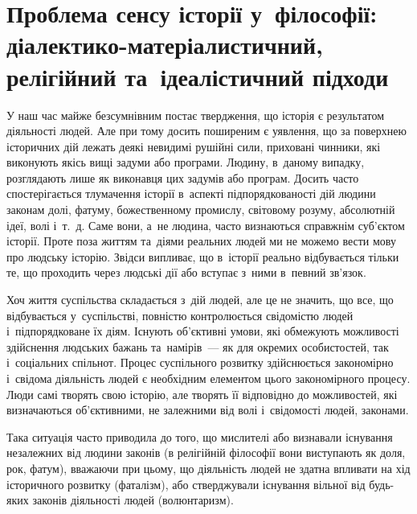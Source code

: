 \documentclass[a5paper,oneside,DIV=12,12pt,headings=small]{scrartcl}
\begin{document}
	\section{Проблема сенсу історії у~філософії: діалектико-матеріалистичний, релігійний та~ідеалістичний підходи}
		У наш час майже безсумнівним постає твердження, що історія є результатом діяльності людей. Але при тому досить поширеним є уявлення, що за поверхнею історичних дій лежать деякі невидимі рушійні сили, приховані чинники, які виконують якісь вищі задуми або програми. Людину, в~даному випадку, розглядають лише як виконавця цих задумів або програм. Досить часто спостерігається тлумачення історії в~аспекті підпорядкованості дій людини законам долі, фатуму, божественному промислу, світовому розуму, абсолютній ідеї, волі і~т.~д. Саме вони, а~не людина, часто визнаються справжнім суб'\-єктом історії. Проте поза життям та~діями реальних людей ми не можемо вести мову про людську історію. Звідси випливає, що в~історії реально відбувається тільки те, що проходить через людські дії або вступає з~ними в~певний зв'язок. 
		
		Хоч життя суспільства складається з~дій людей, але це не значить, що все, що відбувається у~суспільстві, повністю контролюється свідомістю людей і~підпорядковане їх діям. Існують об'\-єктивні умови, які обмежують можливості здійснення людських бажань та~намірів~— як для окремих особистостей, так і~соціальних спільнот. Процес суспільного розвитку здійснюється закономірно і~свідома діяльність людей є необхідним елементом цього закономірного процесу. Люди самі творять свою історію, але творять її відповідно до можливостей, які визначаються об'\-єктивними, не залежними від волі і~свідомості людей, законами. 
		
		Така ситуація часто приводила до того, що мислителі або визнавали існування незалежних від людини законів (в релігійній філософії вони виступають як доля, рок, фатум), вважаючи при цьому, що діяльність людей не здатна впливати на хід історичного розвитку (фаталізм), або стверджували існування вільної від будь-яких законів діяльності людей (волюнтаризм).
		
\end{document}

